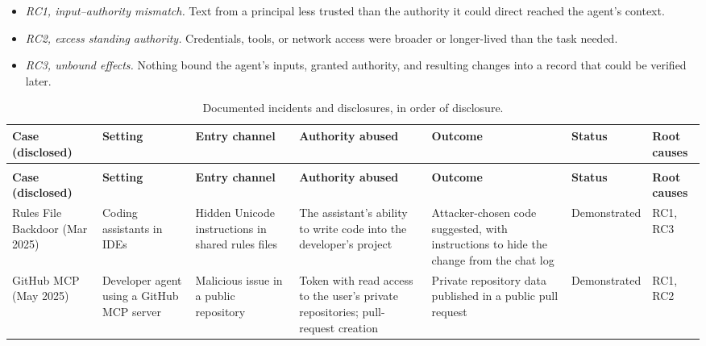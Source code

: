 \documentclass[acmsmall,screen,review]{acmart}
\begin{document}
\begin{itemize}
\item \emph{RC1, input–authority mismatch.} Text from a principal less trusted than the authority it could direct reached the agent's context.
\item \emph{RC2, excess standing authority.} Credentials, tools, or network access were broader or longer-lived than the task needed.
\item \emph{RC3, unbound effects.} Nothing bound the agent's inputs, granted authority, and resulting changes into a record that could be verified later.
\end{itemize}

\begin{landscape}
\begingroup
\scriptsize
\begin{xltabular}{\linewidth}{@{}>{\hsize\raggedright\arraybackslash}X>{\hsize\raggedright\arraybackslash}X>{\hsize\raggedright\arraybackslash}X>{\hsize\raggedright\arraybackslash}X>{\hsize\raggedright\arraybackslash}X>{\hsize\raggedright\arraybackslash}X>{\hsize\raggedright\arraybackslash}X@{}}
\caption{Documented incidents and disclosures, in order of disclosure.}\label{tab:1}\\
\toprule
\textbf{Case (disclosed)} & \textbf{Setting} & \textbf{Entry channel} & \textbf{Authority abused} & \textbf{Outcome} & \textbf{Status} & \textbf{Root causes} \\
\midrule
\endfirsthead
{}\\
\toprule
\textbf{Case (disclosed)} & \textbf{Setting} & \textbf{Entry channel} & \textbf{Authority abused} & \textbf{Outcome} & \textbf{Status} & \textbf{Root causes} \\
\midrule
\endhead
\bottomrule
\endlastfoot
Rules File Backdoor \cite{pillar2025new} (Mar 2025) & Coding assistants in IDEs & Hidden Unicode instructions in shared rules files & The assistant's ability to write code into the developer's project & Attacker-chosen code suggested, with instructions to hide the change from the chat log & Demonstrated & RC1, RC3 \\
GitHub MCP \cite{invariant2025github} (May 2025) & Developer agent using a GitHub MCP server & Malicious issue in a public repository & Token with read access to the user's private repositories; pull-request creation & Private repository data published in a public pull request & Demonstrated & RC1, RC2 \\

\end{xltabular}
\end{landscape}
\end{document}
